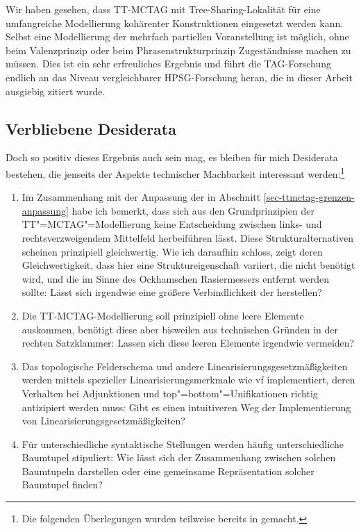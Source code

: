 Wir haben gesehen, dass TT-MCTAG mit Tree-Sharing-Lokalität für eine umfangreiche Modellierung kohärenter Konstruktionen eingesetzt werden kann. Selbst eine Modellierung der mehrfach partiellen Voranstellung ist möglich, ohne beim Valenzprinzip oder beim Phrasenstrukturprinzip Zugeständnisse machen zu müssen. Dies ist ein sehr erfreuliches Ergebnis und führt die TAG-Forschung endlich an das Niveau vergleichbarer HPSG-Forschung heran, die in dieser Arbeit ausgiebig zitiert wurde.

\subsection{Verbliebene Desiderata}

Doch so positiv dieses Ergebnis auch sein mag, es bleiben für mich Desiderata bestehen, die jenseits der Aspekte technischer Machbarkeit interessant werden:\footnote{Die folgenden Überlegungen wurden teilweise bereits in \cite{Lichte:10} gemacht.}
\begin{enumerate}\label{enum-ttmctag-spinal}
  \item Im Zusammenhang mit der Anpassung der  in Abschnitt \ref{sec-ttmctag-grenzen-anpassung} habe ich bemerkt, dass sich aus den Grundprinzipien der TT"=MCTAG"=Modellierung keine Entscheidung zwischen links- und rechtsverzweigendem Mittelfeld herbeiführen lässt. Diese Strukturalternativen scheinen prinzipiell gleichwertig. Wie ich daraufhin schloss, zeigt deren Gleichwertigkeit, dass hier eine Struktureigenschaft variiert, die nicht benötigt wird, und die im Sinne des Ockhamschen Rasiermessers entfernt werden sollte: Lässt sich irgendwie eine grö\ss ere Verbindlichkeit der  herstellen?
  \item Die TT-MCTAG-Modellierung soll prinzipiell ohne leere Elemente auskommen, benötigt diese aber bisweilen aus  technischen Gründen in der rechten Satzklammer: Lassen sich diese leeren Elemente irgendwie vermeiden?
  \item Das topologische Felderschema und andere Linearisierungsgesetzmä\ss igkeiten werden mittels spezieller Linearisierungsmerkmale wie {\sc vf} implementiert, deren Verhalten bei Adjunktionen und {\sc top}"={\sc bottom}"=Unifikationen richtig antizipiert werden muss:  Gibt es einen intuitiveren Weg der Implementierung von Linearisierungsgesetzmä\ss igkeiten?
  \item Für unterschiedliche syntaktische Stellungen werden häufig unterschiedliche Baumtupel stipuliert: Wie lässt sich der Zusammenhang zwischen solchen Baumtupeln darstellen oder eine gemeinsame Repräsentation solcher Baumtupel finden? 
\end{enumerate} 

